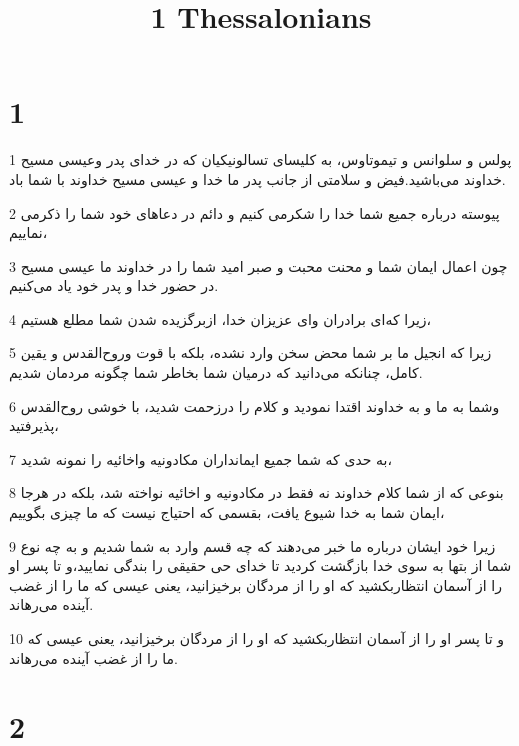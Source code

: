 

\title{1 Thessalonians}


\chapter{1}

\par 1 پولس و سلوانس و تیموتاوس، به کلیسای تسالونیکیان که در خدای پدر وعیسی مسیح خداوند می‌باشید.فیض و سلامتی از جانب پدر ما خدا و عیسی مسیح خداوند با شما باد.
\par 2 پیوسته درباره جمیع شما خدا را شکرمی کنیم و دائم در دعاهای خود شما را ذکرمی نماییم،
\par 3 چون اعمال ایمان شما و محنت محبت و صبر امید شما را در خداوند ما عیسی مسیح در حضور خدا و پدر خود یاد می‌کنیم.
\par 4 زیرا که‌ای برادران و‌ای عزیزان خدا، ازبرگزیده شدن شما مطلع هستیم،
\par 5 زیرا که انجیل ما بر شما محض سخن وارد نشده، بلکه با قوت وروح‌القدس و یقین کامل، چنانکه می‌دانید که درمیان شما بخاطر شما چگونه مردمان شدیم.
\par 6 وشما به ما و به خداوند اقتدا نمودید و کلام را درزحمت شدید، با خوشی روح‌القدس پذیرفتید،
\par 7 به حدی که شما جمیع ایمانداران مکادونیه واخائیه را نمونه شدید،
\par 8 بنوعی که از شما کلام خداوند نه فقط در مکادونیه و اخائیه نواخته شد، بلکه در هرجا ایمان شما به خدا شیوع یافت، بقسمی که احتیاج نیست که ما چیزی بگوییم،
\par 9 زیرا خود ایشان درباره ما خبر می‌دهند که چه قسم وارد به شما شدیم و به چه نوع شما از بتها به سوی خدا بازگشت کردید تا خدای حی حقیقی را بندگی نمایید،و تا پسر او را از آسمان انتظاربکشید که او را از مردگان برخیزانید، یعنی عیسی که ما را از غضب آینده می‌رهاند.
\par 10 و تا پسر او را از آسمان انتظاربکشید که او را از مردگان برخیزانید، یعنی عیسی که ما را از غضب آینده می‌رهاند.

\chapter{2}

